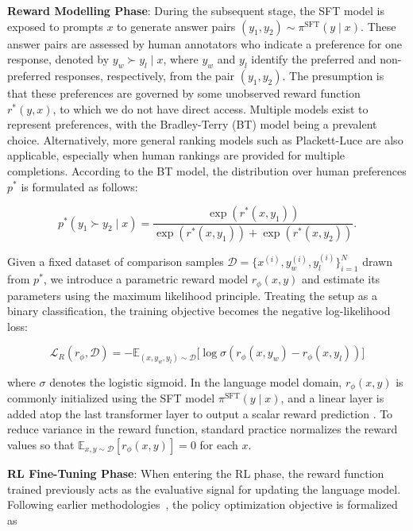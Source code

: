 \textbf{Reward Modelling Phase}: During the subsequent stage, the SFT model is exposed to prompts $x$ to generate answer pairs $(y_1, y_2)\sim \pi^\text{SFT}(y \mid x)$. These answer pairs are assessed by human annotators who indicate a preference for one response, denoted by $y_w\succ y_l \mid x$, where $y_w$ and $y_l$ identify the preferred and non-preferred responses, respectively, from the pair $(y_1, y_2)$. The presumption is that these preferences are governed by some unobserved reward function $r^*(y, x)$, to which we do not have direct access. Multiple models exist to represent preferences, with the Bradley-Terry (BT) model \cite{bradley1952rankanalysis} being a prevalent choice. Alternatively, more general ranking models such as Plackett-Luce \citep{plackett1975analysis, luce2012individual} are also applicable, especially when human rankings are provided for multiple completions. According to the BT model, the distribution over human preferences $p^*$ is formulated as follows:

\begin{equation}\label{eq:bradley-terry}
    p^*(y_1\succ y_2 \mid x)=\frac{\exp\left(r^*(x, y_1)\right)}{\exp\left(r^*(x, y_1)\right) + \exp\left(r^*(x, y_2)\right)}.
\end{equation}

Given a fixed dataset of comparison samples $\mathcal{D}=\bigl\{x^{(i)}, y_w^{(i)}, y_l^{(i)}\bigr\}_{i=1}^N$ drawn from $p^*$, we introduce a parametric reward model $r_{\phi}(x, y)$ and estimate its parameters using the maximum likelihood principle. Treating the setup as a binary classification, the training objective becomes the negative log-likelihood loss:

\begin{equation}\label{eq:reward_model}
    \mathcal{L}_R(r_{\phi}, \mathcal{D}) = -\mathbb{E}_{(x, y_w, y_l)\sim \mathcal{D}}\bigl[\log \sigma(r_{\phi}(x, y_w)- r_{\phi}(x, y_l))\bigr]
\end{equation}

where $\sigma$ denotes the logistic sigmoid. In the language model domain, $r_{\phi}(x, y)$ is commonly initialized using the SFT model $\pi^\text{SFT}(y \mid x)$, and a linear layer is added atop the last transformer layer to output a scalar reward prediction \cite{ziegler2020finetuning}. To reduce variance in the reward function, standard practice normalizes the reward values so that $\mathbb{E}_{x,y\sim \mathcal{D}}\left[r_\phi(x, y)\right] = 0$ for each $x$.

\textbf{RL Fine-Tuning Phase}: When entering the RL phase, the reward function trained previously acts as the evaluative signal for updating the language model. Following earlier methodologies~\citep{jaques2017sequence, jaques2020human}, the policy optimization objective is formalized as

